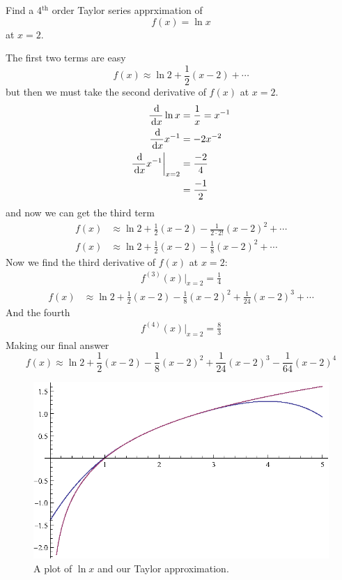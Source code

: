 \begin{ex}
  Find a 4$^\textrm{th}$ order Taylor series apprximation of
  \[ f(x) = \ln x \]
  at $x=2$.
  \begin{sol}
    The first two terms are easy
    \[ f(x) \approx \ln{2} + \frac{1}{2} (x-2) + \cdots \]
    but then we must take the second derivative of $f(x)$ at $x=2$.
    \begin{align*}
      \frac{\,\mathrm{d}}{\,\mathrm{d} x} \ln x &= \frac{1}{x} = x^{-1} \\
      \frac{\,\mathrm{d}}{\,\mathrm{d} x} x^{-1} &= -2 x^{-2} \\
      \frac{\,\mathrm{d}}{\,\mathrm{d} x} x^{-1}\bigg|_{x=2}&= \frac{-2}{4} \\
      &= \frac{-1}{2}
    \end{align*}
    and now we can get the third term
    \begin{align*}
      f(x) &\approx \ln{2} + \frac{1}{2} (x-2) - \frac{1}{2\cdot 2!}(x-2)^2 + \cdots \\
      f(x) &\approx \ln{2} + \frac{1}{2} (x-2) - \frac{1}{8}(x-2)^2 + \cdots
    \end{align*}
    Now we find the third derivative of $f(x)$ at $x=2$:
    \begin{align*}
      f^{(3)}(x)\bigg|_{x=2}=\frac{1}{4}
    \end{align*}
    \begin{align*}
      f(x) &\approx \ln{2} + \frac{1}{2} (x-2) - \frac{1}{8}(x-2)^2 + \frac{1}{24}(x-2)^3 + \cdots
    \end{align*}
    And the fourth
    \begin{align*}
      f^{(4)}(x)\bigg|_{x=2}=\frac{8}{3}
    \end{align*}
    Making our final answer
    \[
      f(x) \approx \ln{2} + \frac{1}{2} (x-2) - \frac{1}{8}(x-2)^2 + \frac{1}{24}(x-2)^3 -\frac{1}{64}(x-2)^4
    \]
    \begin{figure}[H]
      \begin{center}
        \includegraphics{continuous/series/lnxtaylor.eps}
      \end{center}
      \caption{A plot of $\ln x$ and our Taylor approximation.}
    \end{figure}
  \end{sol}
\end{ex}
